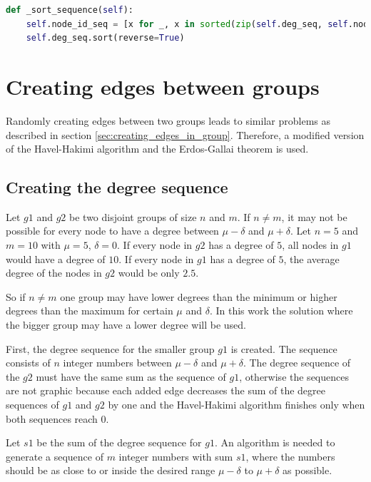 \begin{lstlisting}[language=python, caption={Sorting degrees and node ids}, label={lst:sorting}]
def _sort_sequence(self):
    self.node_id_seq = [x for _, x in sorted(zip(self.deg_seq, self.node_id_seq), reverse=True)]
    self.deg_seq.sort(reverse=True)
\end{lstlisting}

\section{Creating edges between groups}
Randomly creating edges between two groups leads to similar problems as described in section \ref{sec:creating_edges_in_group}. Therefore, a modified version of the Havel-Hakimi algorithm and the Erdos-Gallai theorem is used.

\subsection{Creating the degree sequence}
Let $g1$ and $g2$ be two disjoint groups of size $n$ and $m$. If $n \neq m$, it may not be possible for every node to have a degree between $\mu - \delta$ and $\mu + \delta$. Let $n = 5$ and $m = 10$ with $\mu = 5$, $\delta = 0$. If every node in $g2$ has a degree of $5$, all nodes in $g1$ would have a degree of $10$. If every node in $g1$ has a degree of $5$, the average degree of the nodes in $g2$ would be only $2.5$.

So if $n \neq m$ one group may have lower degrees than the minimum or higher degrees than the maximum for certain $\mu$ and $\delta$. In this work the solution where the bigger group may have a lower degree will be used.
\newline

First, the degree sequence for the smaller group $g1$ is created. The sequence consists of $n$ integer numbers between $\mu - \delta$ and $\mu + \delta$. The degree sequence of the $g2$ must have the same sum as the sequence of $g1$, otherwise the sequences are not graphic because each added edge decreases the sum of the degree sequences of $g1$ and $g2$ by one and the Havel-Hakimi algorithm finishes only when both sequences reach $0$.
\newline

Let $s1$ be the sum of the degree sequence for $g1$. An algorithm is needed to generate a sequence of $m$ integer numbers with sum $s1$, where the numbers should be as close to or inside the desired range $\mu - \delta$ to $\mu + \delta$ as possible.


